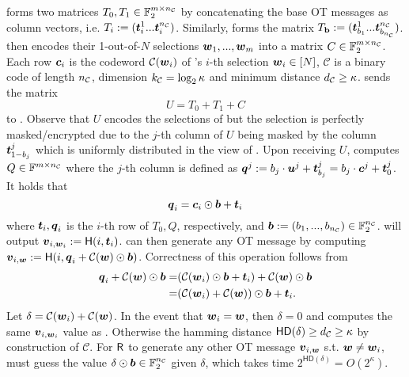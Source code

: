 \rec forms two matrices $T_0,T_1\in \mathbb{F}_2^{m\times \nc}$ by concatenating the base OT messages as column vectors, i.e. $T_i:=(\tt^1_i ... \tt^\nc_i)$. Similarly, \send forms the matrix $T_{\text{\textbf{b}}}:=(\tt^1_{b_1}...\tt^\nc_{b_\nc})$. \rec then encodes their 1-out-of-$N$ selections $\ww_1,...,\ww_m$ into a matrix $C\in \mathbb{F}_2^{m\times \nc}$. Each row $\cc_i$ is the codeword $\mathcal{C}(\ww_i)$ of \rec's $i$-th selection $\ww_i\in [N]$, $\mathcal{C}$ is a binary code of length $\nc$, dimension $\kc=\log_2\kappa$ and minimum distance $\dc\geq\kappa$. \rec sends the matrix
$$
	U=T_0+T_1+C
$$
to \send. Observe that $U$ encodes the selections of \rec but the selection is perfectly masked/encrypted due to the $j$-th column of $U$ being masked by the column $\tt^j_{1-b_j}$ which is uniformly distributed in the view of \send. Upon receiving $U$, \send computes $Q\in\mathbb{F}^{m\times\nc}$ where the $j$-th column is defined as $\qq^j:=b_j\cdot \uu^j+\tt^j_{b_j}=b_j\cdot \cc^j+\tt^j_0$. It holds that 
$$
	\qq_i=\cc_i\odot \bb + \tt_i
$$
where $\tt_i,\qq_i$ is the $i$-th row of $T_0,Q$, respectively, and $\bb:=(b_1,...,b_\nc)\in \mathbb{F}^\nc_2$. \rec will output $\vv_{i,\ww_i}:=\H(i, \tt_i)$. \send can then generate any OT message by computing $\vv_{i,\ww}:=\H(i, \qq_i + \mathcal{C}(\ww)\odot \bb)$. Correctness of this operation follows from 
\begin{align*}
	\qq_i + \mathcal{C}(\ww)\odot \bb =&  (\mathcal{C}(\ww_i)\odot \bb + \tt_i) + \mathcal{C}(\ww)\odot \bb\\
	=& (\mathcal{C}(\ww_i) + \mathcal{C}(\ww)) \odot \bb +\tt_i.
\end{align*}
Let $\delta = \mathcal{C}(\ww_i) + \mathcal{C}(\ww)$. In the event that $\ww_i=\ww$, then $\delta=0$ and \send computes the same $\vv_{i,\ww_i}$ value as \rec. Otherwise the hamming distance $\textsf{HD}(\delta)\geq \dc\geq \kappa$ by construction of $\mathcal{C}$. For $\rec$ to generate any other OT message $\vv_{i,\ww}$ s.t. $\ww\neq \ww_i$, \rec must guess the value $\delta\odot \bb\in \mathbb{F}^\nc_2$ given $\delta$, which takes time $2^{\textsf{HD}(\delta)}=O(2^\kappa)$.


